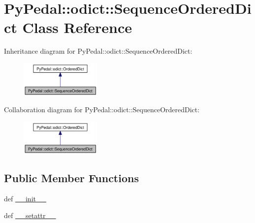 \hypertarget{classPyPedal_1_1odict_1_1SequenceOrderedDict}{
\section{PyPedal::odict::SequenceOrderedDict Class Reference}
\label{classPyPedal_1_1odict_1_1SequenceOrderedDict}
}
Inheritance diagram for PyPedal::odict::SequenceOrderedDict:\nopagebreak
\begin{figure}[H]
\begin{center}
\leavevmode
\includegraphics[width=112pt]{classPyPedal_1_1odict_1_1SequenceOrderedDict__inherit__graph}
\end{center}
\end{figure}
Collaboration diagram for PyPedal::odict::SequenceOrderedDict:\nopagebreak
\begin{figure}[H]
\begin{center}
\leavevmode
\includegraphics[width=112pt]{classPyPedal_1_1odict_1_1SequenceOrderedDict__coll__graph}
\end{center}
\end{figure}
\subsection*{Public Member Functions}
\begin{CompactItemize}
\item 
def \hyperlink{classPyPedal_1_1odict_1_1SequenceOrderedDict_622163e06c3058e0bbca95a379f21a00}{\_\-\_\-init\_\-\_\-}
\item 
def \hyperlink{classPyPedal_1_1odict_1_1SequenceOrderedDict_0141943432f71113ff9998bd8087e50d}{\_\-\_\-setattr\_\-\_\-}
\end{CompactItemize}
